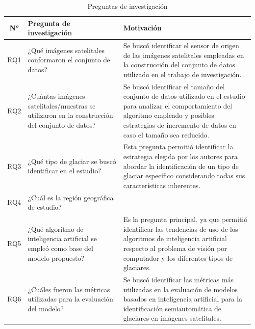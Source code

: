 \documentclass{article}
\begin{document}
\begin{table}[H]
    \centering
    \caption{Preguntas de investigación}
    \hspace{1cm}
    \label{tab:research_questions}
    \begin{tabularx}{\textwidth}{cXX}
        \hline
        \textbf{N°} & \textbf{Pregunta de investigación}                                                             & \textbf{Motivación}                                                                                                                                                                                               \\ \hline
        RQ1         & ¿Qué imágenes satelitales conformaron el conjunto de datos?                                    & Se buscó identificar el sensor de origen de las imágenes satelitales empleadas en la construcción del conjunto de datos utilizado en el trabajo de investigación.                                                 \\ \hline
        RQ2         & ¿Cuántas imágenes satelitales/muestras se utilizaron en la construcción del conjunto de datos? & Se buscó identificar el tamaño del conjunto de datos utilizado en el estudio para analizar el comportamiento del algoritmo empleado y posibles estrategias de incremento de datos en caso el tamaño sea reducido. \\ \hline
        RQ3         & ¿Qué tipo de glaciar se buscó identificar en el estudio?                                       & Esta pregunta permitió identificar la estrategia elegida por los autores para abordar la identificación de un tipo de glaciar específico considerando todas sus características inherentes.                       \\ \hline
        RQ4         & ¿Cuál es la región geográfica de estudio?                                                      &                                                                                                                                                                                                                   \\ \hline
        RQ5         & ¿Qué algoritmo de inteligencia artificial se empleó como base del modelo propuesto?            & Es la pregunta principal, ya que permitió identificar las tendencias de uso de los algoritmos de inteligencia artificial respecto al problema de visión por computador y los diferentes tipos de glaciares.       \\ \hline
        RQ6         & ¿Cuáles fueron las métricas utilizadas para la evaluación del modelo?                          & Se buscó identificar las métricas más utilizadas en la evaluación de modelos basados en inteligencia artificial para la identificación semiautomática de glaciares en imágenes satelitales.                       \\ \hline
    \end{tabularx}
\end{table}
\end{document}
